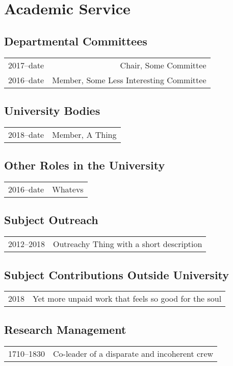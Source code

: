 


\section{Academic Service}

\subsection{Departmental Committees}
\begin{tabular}{L!{\VRule}R}
  2017--date & Chair, Some Committee\\
  2016--date & Member, Some Less Interesting Committee\\
\end{tabular}

\subsection{University Bodies}
\begin{tabular}{L!{\VRule}R}
  2018--date & Member, A Thing\\
\end{tabular}

\subsection{Other Roles in the University}
\begin{tabular}{L!{\VRule}R}
  2016--date & Whatevs\\
\end{tabular}

\subsection{Subject Outreach}
\begin{tabular}{L!{\VRule}R}
  2012--2018 & Outreachy Thing with a short description \\
\end{tabular}

\subsection{Subject Contributions Outside University}
\begin{tabular}{L!{\VRule}R}
  2018 & Yet more unpaid work that feels so good for the soul\\
\end{tabular}

\subsection{Research Management}
\begin{tabular}{L!{\VRule}R}
  1710--1830 & Co-leader of a disparate and incoherent crew\\
\end{tabular}


